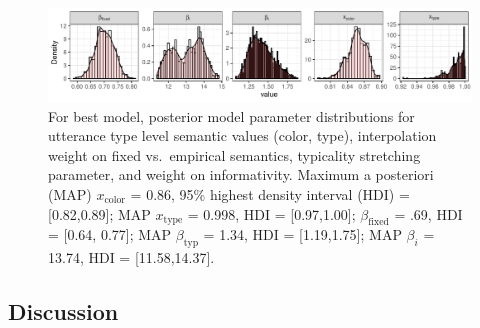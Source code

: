 \documentclass[11pt]{article}
\begin{document}
\begin{figure}
\centering
\includegraphics[width=\textwidth]{pics/exp2-cost-none-sem-fixedplusempirical-paramposteriors}
\caption{For best model, posterior model parameter distributions for utterance type level semantic values (color, type), interpolation weight on fixed vs.~empirical semantics, typicality stretching parameter, and weight on informativity. Maximum a posteriori (MAP)  $x_{\textrm{color}}$ = 0.86, 95\% highest density interval (HDI) = [0.82,0.89]; MAP $x_{\textrm{type}}$ = 0.998, HDI = [0.97,1.00]; $\beta_{\textrm{fixed}}$ = .69, HDI = [0.64, 0.77]; MAP $\beta_{\textrm{typ}}$ = 1.34, HDI = [1.19,1.75]; MAP $\beta_i$ = 13.74, HDI = [11.58,14.37].}
\label{fig:typparamposteriors}
\end{figure}




\subsection{Discussion}
\end{document}
